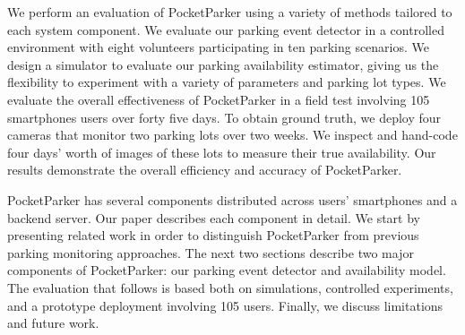We perform an evaluation of PocketParker using a variety of methods
tailored to each system component. We evaluate our parking event detector in
a controlled environment with eight volunteers participating in ten parking
scenarios. We design a simulator to evaluate our parking availability
estimator, giving us the flexibility to experiment with a variety of
parameters and parking lot types. We evaluate the overall effectiveness of
PocketParker in a field test involving 105 smartphones users over forty five
days. To obtain ground truth, we deploy four cameras that monitor two parking
lots over two weeks. We inspect and hand-code four days' worth of images of
these lots to measure their true availability. Our results demonstrate the
overall efficiency and accuracy of PocketParker.

PocketParker has several components distributed across users' smartphones and
a backend server. Our paper describes each component in detail. We start by
presenting related work in order to distinguish PocketParker from previous
parking monitoring approaches. The next two sections describe two major
components of PocketParker: our parking event detector and availability model.
The evaluation that follows is based both on simulations, controlled
experiments, and a prototype deployment involving 105 users.  Finally, we
discuss limitations and future work.

